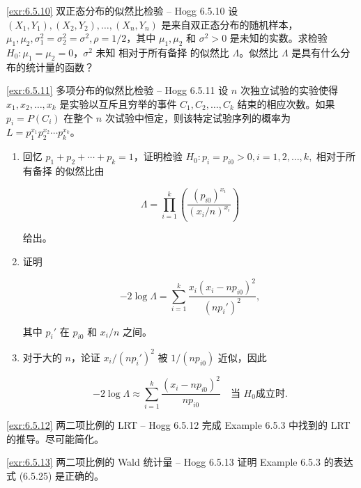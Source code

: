 \begin{exercise}{\ref{exr:6.5.10} 双正态分布的似然比检验 – Hogg 6.5.10}\label{exr:6.5.10}
设 $(X_1,Y_1),(X_2,Y_2),\ldots,(X_n,Y_n)$ 是来自双正态分布的随机样本，$\mu_1,\mu_2,\sigma_1^2=\sigma_2^2=\sigma^2,\rho=1/2$，其中 $\mu_1,\mu_2$ 和 $\sigma^2>0$ 是未知的实数。求检验 $H_0: \mu_1=\mu_2=0$，$\sigma^2$ 未知 相对于所有备择 的似然比 $\Lambda$。似然比 $\Lambda$ 是具有什么分布的统计量的函数？
\end{exercise}

\begin{exercise}{\ref{exr:6.5.11} 多项分布的似然比检验 – Hogg 6.5.11}\label{exr:6.5.11}
设 $n$ 次独立试验的实验使得 $x_1, x_2, \ldots, x_k$ 是实验以互斥且穷举的事件 $C_1, C_2, \ldots, C_k$ 结束的相应次数。如果 $p_i = P(C_i)$ 在整个 $n$ 次试验中恒定，则该特定试验序列的概率为 $L = p_1^{x_1}p_2^{x_2}\cdots p_k^{x_k}$。

\begin{enumerate}
\item[(a)] 回忆 $p_1 + p_2 + \cdots + p_k = 1$，证明检验 $H_0: p_i = p_{i0} > 0, i=1,2,\ldots,k,$ 相对于所有备择 的似然比由

\[
\Lambda = \prod_{i=1}^k \left( \frac{(p_{i0})^{x_i}}{(x_i/n)^{x_i}} \right)
\]

给出。

\item[(b)] 证明

\[
-2\log\Lambda = \sum_{i=1}^k \frac{x_i(x_i - np_{i0})^2}{(np_i')^2},
\]

其中 $p_i'$ 在 $p_{i0}$ 和 $x_i/n$ 之间。

\item[(c)] 对于大的 $n$，论证 $x_i/(np_i')^2$ 被 $1/(np_{i0})$ 近似，因此

\[
-2\log\Lambda \approx \sum_{i=1}^k \frac{(x_i - np_{i0})^2}{np_{i0}} \quad \text{当 } H_0 \text{成立时}.
\]
\end{enumerate}
\end{exercise}

\begin{exercise}{\ref{exr:6.5.12} 两二项比例的 LRT – Hogg 6.5.12}\label{exr:6.5.12}
完成 Example 6.5.3 中找到的 LRT 的推导。尽可能简化。
\end{exercise}

\begin{exercise}{\ref{exr:6.5.13} 两二项比例的 Wald 统计量 – Hogg 6.5.13}\label{exr:6.5.13}
证明 Example 6.5.3 的表达式 (6.5.25) 是正确的。
\end{exercise}


